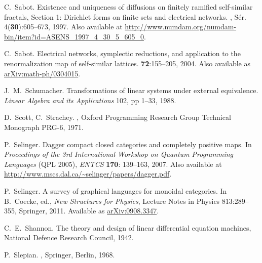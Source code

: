 \begin{thebibliography}{RSW00}
    C.\ Sabot.
    \newblock Existence and uniqueness of diffusions on
    finitely ramified self-similar fractals, Section 1: Dirichlet forms on
    finite sets and electrical networks.
    , S\'er. 4({\bf 30}):605--673, 1997.
    \newblock Also available at
    \href{http://www.numdam.org/numdam-bin/item?id=ASENS_1997_4_30_5_605_0}{http://www.numdam.org/numdam-bin/item?id=ASENS\_1997\_4\_30\_5\_605\_0}.

    C.\ Sabot.
    \newblock Electrical networks, symplectic reductions, and
    application to the renormalization map of self-similar lattices.
     {\bf 72}:155--205, 2004.
    \newblock Also available as
    \href{http://arxiv.org/abs/math-ph/0304015}{arXiv:math-ph/0304015}.

    J.\ M.\ Schumacher.
    \newblock Transformations of linear systems under
    external equivalence.
    \newblock \emph{Linear Algebra and its Applications} 102,
    pp 1--33, 1988.

    D.\ Scott, C.\ Strachey.
    ,
    Oxford Programming Research Group Technical Monograph PRG-6, 1971.


    P.\ Selinger.
    \newblock Dagger compact closed categories and completely
    positive maps.
    \newblock In {\sl Proceedings of the 3rd International Workshop on
    Quantum Programming Languages} (QPL 2005), {\sl ENTCS} {\bf 170}:
    139--163, 2007.
    \newblock Also available at
    \href{http://www.mscs.dal.ca/~selinger/papers/dagger.pdf}{http://www.mscs.dal.ca/\~{}selinger/papers/dagger.pdf}.

    P.\ Selinger.
    \newblock A survey of graphical languages
    for monoidal categories.
    \newblock In B.\ Coecke, ed., \emph{New Structures for
    Physics}, Lecture Notes in Physics 813:289--355, Springer, 2011.
    \newblock Available
    as \href{http://arxiv.org/abs/0908.3347}{arXiv:0908.3347}.

    C.\ E.\ Shannon.
    \newblock The theory and design of linear differential equation machines, National Defence Research Council, 1942.


    P.\ Slepian.
    , Springer, Berlin, 1968. 


\end{thebibliography}
